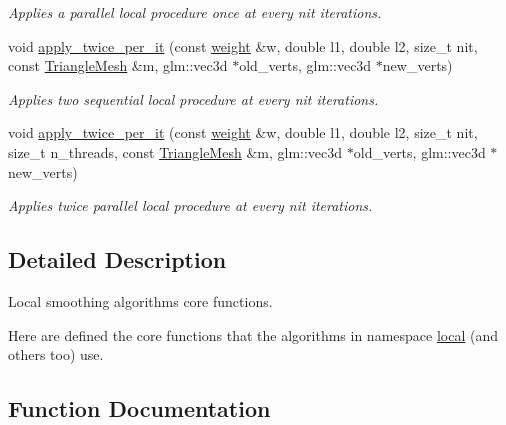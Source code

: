 \begin{DoxyCompactItemize}
\begin{DoxyCompactList}\small\item\em Applies a parallel local procedure once at every {\itshape nit} iterations. \end{DoxyCompactList}\item 
void \hyperlink{namespacegeoproc_1_1smoothing_1_1local__private_ac6f757e71e29b9ecfc9c58fec7e7a85c}{apply\+\_\+twice\+\_\+per\+\_\+it} (const \hyperlink{namespacegeoproc_a12e5a10581b53b9dd9a509127527f843}{weight} \&w, double l1, double l2, size\+\_\+t nit, const \hyperlink{classgeoproc_1_1TriangleMesh}{Triangle\+Mesh} \&m, glm\+::vec3d $\ast$old\+\_\+verts, glm\+::vec3d $\ast$new\+\_\+verts)
\begin{DoxyCompactList}\small\item\em Applies two sequential local procedure at every {\itshape nit} iterations. \end{DoxyCompactList}\item 
void \hyperlink{namespacegeoproc_1_1smoothing_1_1local__private_a6645206975dae13bf3f0fef91a7ede92}{apply\+\_\+twice\+\_\+per\+\_\+it} (const \hyperlink{namespacegeoproc_a12e5a10581b53b9dd9a509127527f843}{weight} \&w, double l1, double l2, size\+\_\+t nit, size\+\_\+t n\+\_\+threads, const \hyperlink{classgeoproc_1_1TriangleMesh}{Triangle\+Mesh} \&m, glm\+::vec3d $\ast$old\+\_\+verts, glm\+::vec3d $\ast$new\+\_\+verts)
\begin{DoxyCompactList}\small\item\em Applies twice parallel local procedure at every {\itshape nit} iterations. \end{DoxyCompactList}\end{DoxyCompactItemize}


\subsection{Detailed Description}
Local smoothing algorithms core functions. 

Here are defined the core functions that the algorithms in namespace \hyperlink{namespacegeoproc_1_1smoothing_1_1local}{local} (and others too) use. 

\subsection{Function Documentation}
\mbox{\label{namespacegeoproc_1_1smoothing_1_1local__private_a2a4d35025db072c097158a3e0f0a39b9}} 
